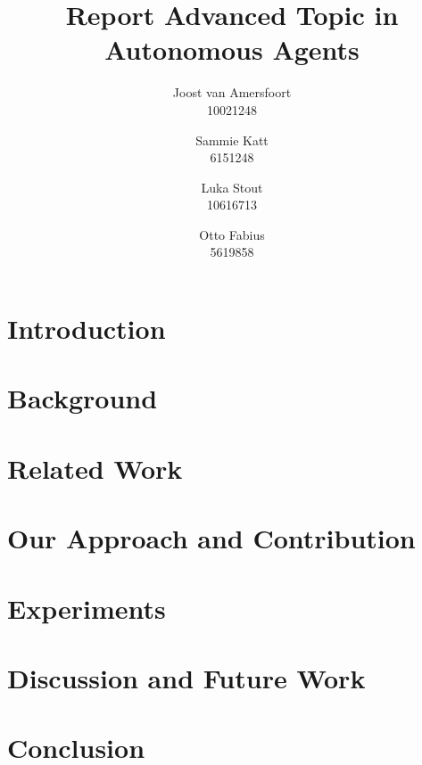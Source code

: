 \documentclass{article}
\title{Report Advanced Topic in Autonomous Agents}
\author{Joost van Amersfoort \\ 10021248 \and Sammie Katt \\ 6151248 \and Luka Stout \\ 10616713 \and Otto Fabius \\ 5619858}
\begin{document}
\maketitle
\tableofcontents
\newpage

\section{Introduction}


\section{Background}


\section{Related Work}


\section{Our Approach and Contribution}


\section{Experiments}


\section{Discussion and Future Work}


\section{Conclusion}

\end{document}
